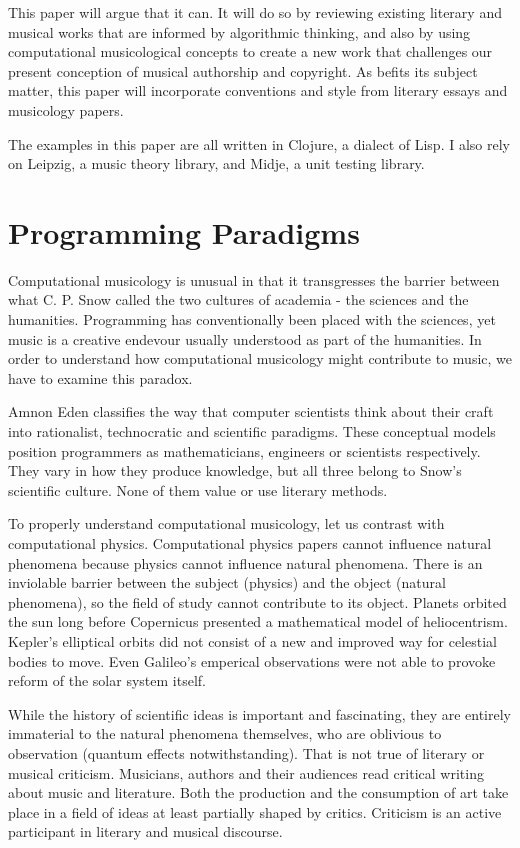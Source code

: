 \documentclass[numbers]{sigplanconf}
\begin{document}
This paper will argue that it can. It will do so by reviewing existing literary and musical works that are informed by algorithmic
thinking, and also by using computational musicological concepts to create a new work that challenges our present conception of musical
authorship and copyright. As befits its subject matter, this paper will incorporate conventions and style from literary essays
and musicology papers.

The examples in this paper are all written in Clojure\cite{Clojure}, a dialect of Lisp. I also rely on Leipzig\cite{Leipzig},
a music theory library, and Midje\cite{Midje}, a unit testing library.

\section{Programming Paradigms}

Computational musicology is unusual in that it transgresses the barrier between what C. P. Snow called the two cultures of academia
- the sciences and the humanities\cite{Two Cultures}. Programming has conventionally been placed with the sciences, yet music is a
creative endevour usually understood as part of the humanities. In order to understand how computational musicology might
contribute to music, we have to examine this paradox.

Amnon Eden classifies the way that computer scientists think about their craft into rationalist, technocratic and scientific paradigms\cite{Three Paradigms}.
These conceptual models position programmers as mathematicians, engineers or scientists respectively. They vary in how they
produce knowledge, but all three belong to Snow's scientific culture. None of them value or use literary methods.

To properly understand computational musicology, let us contrast with computational physics. Computational physics papers cannot
influence natural phenomena because physics cannot influence natural phenomena.
There is an inviolable barrier between the subject (physics) and
the object (natural phenomena), so the field of study cannot contribute to its object. Planets orbited the sun long before
Copernicus presented a mathematical model of heliocentrism. Kepler's elliptical orbits did not consist of a new and improved way
for celestial bodies to move. Even Galileo's emperical observations were not able to provoke reform of the solar system itself.

While the history of scientific ideas is important and fascinating, they are entirely immaterial to the natural phenomena
themselves, who are oblivious to observation (quantum effects notwithstanding). That is not true of literary or musical criticism.
Musicians, authors and their audiences read critical writing about music and literature. Both the production and the consumption
of art take place in a field of ideas at least partially shaped by critics. Criticism is an active participant in literary and
musical discourse.
\end{document}
